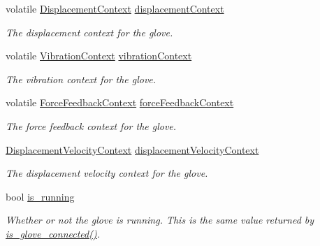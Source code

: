 \begin{DoxyCompactItemize}
\item 
\mbox{\label{struct_maestro_glove_context_ab854be82f90a440600e7b98156b4add0}} 
volatile \hyperlink{struct_displacement_context}{Displacement\+Context} \hyperlink{struct_maestro_glove_context_ab854be82f90a440600e7b98156b4add0}{displacement\+Context}
\begin{DoxyCompactList}\small\item\em The displacement context for the glove. \end{DoxyCompactList}\item 
\mbox{\label{struct_maestro_glove_context_aaea0ce977d0cbc493305f6cb52f6d8e9}} 
volatile \hyperlink{struct_vibration_context}{Vibration\+Context} \hyperlink{struct_maestro_glove_context_aaea0ce977d0cbc493305f6cb52f6d8e9}{vibration\+Context}
\begin{DoxyCompactList}\small\item\em The vibration context for the glove. \end{DoxyCompactList}\item 
\mbox{\label{struct_maestro_glove_context_a42bb0346f24c9e5e078b430af447121f}} 
volatile \hyperlink{struct_force_feedback_context}{Force\+Feedback\+Context} \hyperlink{struct_maestro_glove_context_a42bb0346f24c9e5e078b430af447121f}{force\+Feedback\+Context}
\begin{DoxyCompactList}\small\item\em The force feedback context for the glove. \end{DoxyCompactList}\item 
\mbox{\label{struct_maestro_glove_context_a3cc0b2a5c0c6f1c330ac7e7713805e8e}} 
\hyperlink{struct_displacement_velocity_context}{Displacement\+Velocity\+Context} \hyperlink{struct_maestro_glove_context_a3cc0b2a5c0c6f1c330ac7e7713805e8e}{displacement\+Velocity\+Context}
\begin{DoxyCompactList}\small\item\em The displacement velocity context for the glove. \end{DoxyCompactList}\item 
\mbox{\label{struct_maestro_glove_context_a95cbd6b99430748422cc048b4f29dc52}} 
bool \hyperlink{struct_maestro_glove_context_a95cbd6b99430748422cc048b4f29dc52}{is\+\_\+running}
\begin{DoxyCompactList}\small\item\em Whether or not the glove is running. This is the same value returned by {\ttfamily \hyperlink{group__glove_management_ga85666868951331c5266df7559abeefbc}{is\+\_\+glove\+\_\+connected()}}. \end{DoxyCompactList}\end{DoxyCompactItemize}


